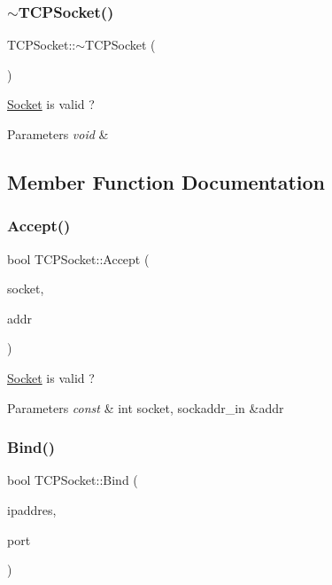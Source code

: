 \subsubsection{\texorpdfstring{$\sim$\+T\+C\+P\+Socket()}{~TCPSocket()}}
{\footnotesize\ttfamily T\+C\+P\+Socket\+::$\sim$\+T\+C\+P\+Socket (\begin{DoxyParamCaption}{ }\end{DoxyParamCaption})}



\hyperlink{class_socket}{Socket} is valid ? 


\begin{DoxyParams}{Parameters}
{\em void} & \\
\hline
\end{DoxyParams}


\subsection{Member Function Documentation}
\mbox{\label{class_t_c_p_socket_a3b6b62c9fc568585dc62f2763455a058}} 
\subsubsection{\texorpdfstring{Accept()}{Accept()}}
{\footnotesize\ttfamily bool T\+C\+P\+Socket\+::\+Accept (\begin{DoxyParamCaption}\item[{const int}]{socket,  }\item[{sockaddr\+\_\+in \&}]{addr }\end{DoxyParamCaption})}



\hyperlink{class_socket}{Socket} is valid ? 


\begin{DoxyParams}{Parameters}
{\em const} & int socket, sockaddr\+\_\+in \&addr \\
\hline
\end{DoxyParams}
\mbox{\label{class_t_c_p_socket_ace5b4e24ee632208ccc5edc74dd151c9}} 
\subsubsection{\texorpdfstring{Bind()}{Bind()}}
{\footnotesize\ttfamily bool T\+C\+P\+Socket\+::\+Bind (\begin{DoxyParamCaption}\item[{const std\+::string \&}]{ipaddres,  }\item[{unsigned short}]{port }\end{DoxyParamCaption})}



